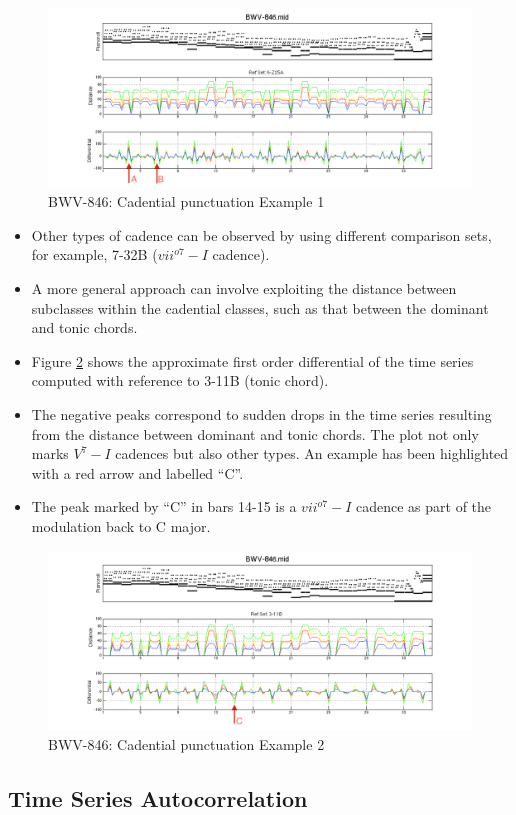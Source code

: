 \documentclass{article}
\begin{document}
\begin{figure}[htb]
\centering
\includegraphics[width=.8\linewidth]{./plots/cadence.png}
\caption{\label{fig:cadence}BWV-846: Cadential punctuation Example 1}
\end{figure}
\begin{itemize}
\item Other types of cadence can be observed by using different comparison
  sets, for example, 7-32B ($vii^{o7}-I$ cadence).
\item A more general approach can involve exploiting the distance between
  subclasses within the cadential classes, such as that between the
  dominant and tonic chords.
\item Figure \ref{fig:cadence2} shows the approximate first order
  differential of the time series computed with reference to 3-11B
  (tonic chord).
\item The negative peaks correspond to sudden drops in the time series
  resulting from the distance between dominant and tonic chords. The
  plot not only marks $V^{7}-I$ cadences but also other types. An example
  has been highlighted with a red arrow and labelled ``C''.
\item The peak marked by ``C'' in bars 14-15 is a $vii^{o7}-I$ cadence as
  part of the modulation back to C major.
\end{itemize}
\begin{figure}[htb]
\centering
\includegraphics[width=.8\linewidth]{./plots/cadence2.png}
\caption{\label{fig:cadence2}BWV-846: Cadential punctuation Example 2}
\end{figure}
\subsection{Time Series Autocorrelation}
\label{sec-8-4}
\end{document}
